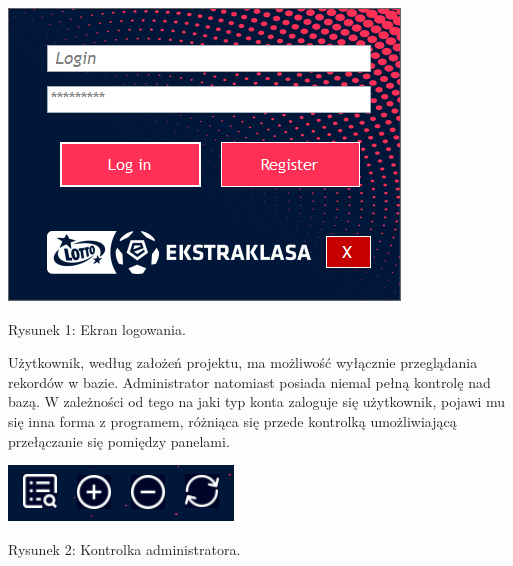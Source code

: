 \documentclass[12pt,a4paper]{article}
\begin{document}
    \begin{center}
        \includegraphics[scale=1]{login-panel.png}
        \begin{flushleft}
            \begin{scriptsize}
            \begin{list}{}{\leftmargin=21.5em}\raggedright\item\relax
            Rysunek 1: Ekran logowania.
            \end{list}
            \end{scriptsize}
        \end{flushleft}
    \end{center}

    Użytkownik, według założeń projektu, ma możliwość wyłącznie przeglądania rekordów w bazie. Administrator natomiast posiada niemal pełną kontrolę nad bazą. W zależności od tego na jaki typ konta zaloguje się użytkownik, pojawi mu się inna forma z programem, różniąca się przede kontrolką umożliwiającą przełączanie się pomiędzy panelami.

    \begin{center}
        \includegraphics[scale=1]{admin-controls.png}
        \begin{flushleft}
            \begin{scriptsize}
            \begin{list}{}{\leftmargin=19em}\raggedright\item\relax
            Rysunek 2: Kontrolka administratora.
            \end{list}
            \end{scriptsize}
        \end{flushleft}
    \end{center}
\end{document}
